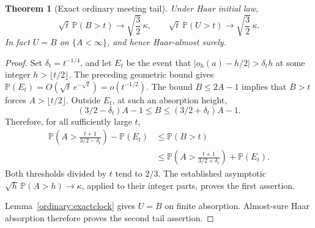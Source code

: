 \documentclass[11pt]{amsart}
\newtheorem{theorem}{Theorem}[section]
\theoremstyle{definition}
\theoremstyle{remark}
\newcommand{\PP}{\mathbb P}
\begin{document}
\begin{theorem}[Exact ordinary meeting tail]\label{ordinary:tail}
Under Haar initial law,
\[
 \sqrt t\,\PP(B>t)\longrightarrow\sqrt{\frac32}\,\kappa,
 \qquad
 \sqrt t\,\PP(U>t)\longrightarrow\sqrt{\frac32}\,\kappa.
\]
In fact $U=B$ on $\{A<\infty\}$, and hence Haar-almost surely.
\end{theorem}
\begin{proof}
Set $\delta_t=t^{-1/4}$, and let $E_t$ be the event that
$|o_h(a)-h/2|>\delta_t h$ at some integer $h>\lfloor t/2\rfloor$.
The preceding geometric bound gives
$\PP(E_t)=O(\sqrt t\,e^{-\sqrt t})=o(t^{-1/2})$.
The bound $B\le2A-1$ implies that $B>t$ forces $A>\lfloor t/2\rfloor$.
Outside $E_t$, at such an absorption height,
\[
 (3/2-\delta_t)A-1\le B\le(3/2+\delta_t)A-1.
\]
Therefore, for all sufficiently large $t$,
\begin{align*}
 \PP\left(A>\frac{t+1}{3/2-\delta_t}\right)-\PP(E_t)
 &\le\PP(B>t)\\
 &\le\PP\left(A>\frac{t+1}{3/2+\delta_t}\right)+\PP(E_t).
\end{align*}
Both thresholds divided by $t$ tend to $2/3$. The established asymptotic
$\sqrt h\,\PP(A>h)\to\kappa$, applied to their integer parts, proves
the first assertion.

Lemma~\ref{ordinary:exactclock} gives $U=B$ on finite absorption.
Almost-sure Haar absorption therefore proves the second tail assertion.
\end{proof}
\end{document}
